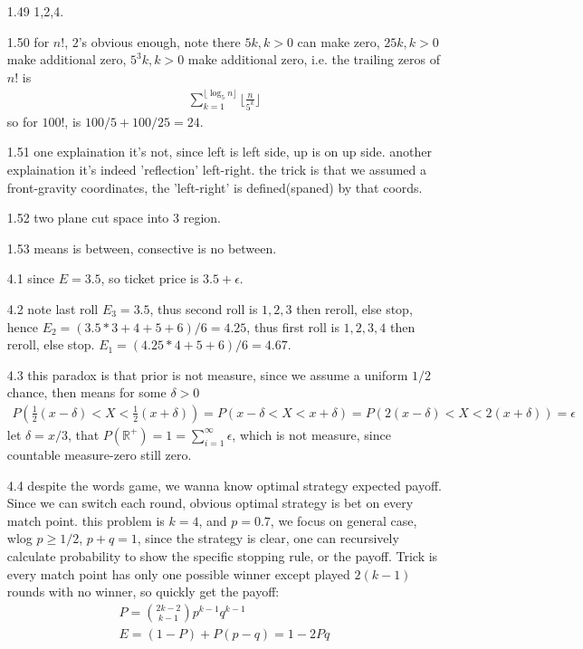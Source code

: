 \documentclass[paper=a4, fontsize=11pt]{scrartcl} %
\numberwithin{equation}{section} %
\numberwithin{figure}{section} %
\numberwithin{table}{section} %
\begin{document}
\begin{itemize}
	\item[1.49] 1,2,4.
	\item[1.50] for $n!$, $2$'s obvious enough, note there $5k,k>0$ can make zero, $25k,k>0$ make additional zero, $5^3k,k>0$ make additional zero, i.e. the trailing zeros of $n!$ is
	\begin{align}
		\sum_{k=1}^{\lfloor \log_5 n \rfloor} \lfloor \frac{n}{5^k}\rfloor
	\end{align}
	so for $100!$, is $100/5 + 100/25= 24$.
	\item[1.51] one explaination it's not, since left is left side, up is on up side. another explaination it's indeed 'reflection' left-right. the trick is that we assumed a front-gravity coordinates, the 'left-right' is defined(spaned) by that coords.
	\item[1.52] two plane cut space into 3 region.
	\item[1.53] means is between, consective is no between.
	\item[4.1] since $E=3.5$, so ticket price is $3.5+\epsilon$.
	\item[4.2] note last roll $E_3=3.5$, thus second roll is $1,2,3$ then reroll, else stop, hence $E_2 = (3.5*3+4+5+6)/6=4.25$, thus first roll is $1,2,3,4$ then reroll, else stop. $E_1 = (4.25*4+5+6)/6=4.67$.
	\item[4.3] this paradox is that prior is not measure, since we assume a uniform $1/2$ chance, then means for some $\delta>0$
	\begin{align}
		P(\frac{1}{2}(x-\delta)<X<\frac{1}{2}(x+\delta)) = P(x-\delta<X<x+\delta)=P(2(x-\delta)<X<2(x+\delta))=\epsilon
	\end{align}
	let $\delta = x/3$, that $P(\mathbb{R}^+)=1 =\sum_{i=1}^\infty \epsilon$, which is not measure, since countable measure-zero still zero.
	\item[4.4] despite the words game, we wanna know optimal strategy expected payoff. Since we can switch each round, obvious optimal strategy is bet on every match point. this problem is $k=4$, and $p=0.7$, we focus on general case, wlog $p\geq 1/2$, $p+q=1$, since the strategy is clear, one can recursively calculate probability to show the specific stopping rule, or the payoff. Trick is every match point has only one possible winner except played $2(k-1)$ rounds with no winner, so quickly get the payoff:
	\begin{align}
		P = {2k-2 \choose k-1} p^{k-1}q^{k-1}\\
		E = (1-P) + P(p-q) = 1- 2Pq
	\end{align}

\end{itemize}
\end{document}
